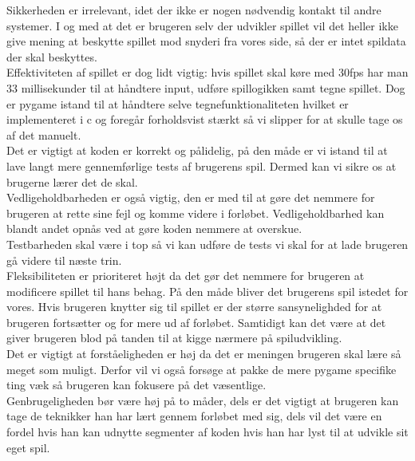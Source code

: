 \documentclass[10pt,a4paper,danish]{article}
\begin{document}
Sikkerheden er irrelevant, idet der ikke er nogen nødvendig kontakt til andre systemer. I og med at det er brugeren selv der udvikler spillet vil det heller ikke give mening at beskytte spillet mod snyderi fra vores side, så der er intet spildata der skal beskyttes.
\\

Effektiviteten af spillet er dog lidt vigtig: hvis spillet skal køre med 30fps har man 33 millisekunder til at håndtere input, udføre spillogikken samt tegne spillet. Dog er pygame istand til at håndtere selve tegnefunktionaliteten hvilket er implementeret i c og foregår forholdsvist stærkt så vi slipper for at skulle tage os af det manuelt.
\\

Det er vigtigt at koden er korrekt og pålidelig, på den måde er vi istand til at lave langt mere gennemførlige tests af brugerens spil. Dermed kan vi sikre os at brugerne lærer det de skal.
\\

Vedligeholdbarheden er også vigtig, den er med til at gøre det nemmere for brugeren at rette sine fejl og komme videre i forløbet. Vedligeholdbarhed kan blandt andet opnås ved at gøre koden nemmere at overskue.
\\

Testbarheden skal være i top så vi kan udføre de tests vi skal for at lade brugeren gå videre til næste trin.
\\

Fleksibiliteten er prioriteret højt da det gør det nemmere for brugeren at modificere spillet til hans behag. På den måde bliver det brugerens spil istedet for vores. Hvis brugeren knytter sig til spillet er der større sansynelighded for at brugeren fortsætter og for mere ud af forløbet. Samtidigt kan det være at det giver brugeren blod på tanden til at kigge nærmere på spiludvikling.
\\

Det er vigtigt at forståeligheden er høj da det er meningen brugeren skal lære så meget som muligt. Derfor vil vi også forsøge at pakke de mere pygame specifike ting væk så brugeren kan fokusere på det væsentlige.
\\

Genbrugeligheden bør være høj på to måder, dels er det vigtigt at brugeren kan tage de teknikker han har lært gennem forløbet med sig, dels vil det være en fordel hvis han kan udnytte segmenter af koden hvis han har lyst til at udvikle sit eget spil.
\\
\end{document}
